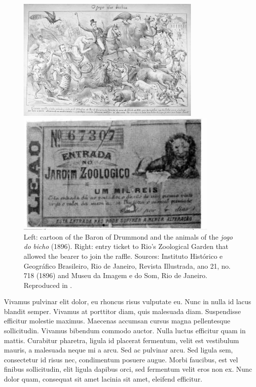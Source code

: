 \documentclass[a4paper,12pt]{article}
\begin{document}
\begin{figure}[!htbp]
 \centering
 \begin{minipage}[b]{0.45\textwidth}
  \includegraphics[width=\textwidth, height=6cm]{images/bicho01.jpg}
 \end{minipage}
 \hfill
 \begin{minipage}[b]{0.45\textwidth}
  \includegraphics[width=\textwidth, height=6cm]{images/bicho02.jpg}
 \end{minipage}
 \caption{Left: cartoon of the Baron of Drummond and the animals of the \emph{jogo do bicho} (1896). Right: entry ticket to Rio's Zoological Garden that allowed the bearer to join the raffle. Sources: Instituto Histórico e Geográfico Brasileiro, Rio de Janeiro, Revista Illustrada, ano 21, no. 718 (1896) and Museu da Imagem e do Som, Rio de Janeiro. Reproduced in \citet[35--36]{chazkel2011laws}.}
 \label{fig:barao}
\end{figure}

Vivamus pulvinar elit dolor, eu rhoncus risus vulputate eu. Nunc in nulla id lacus blandit semper. Vivamus at porttitor diam, quis malesuada diam. Suspendisse efficitur molestie maximus. Maecenas accumsan cursus magna pellentesque sollicitudin. Vivamus bibendum commodo auctor. Nulla luctus efficitur quam in mattis. Curabitur pharetra, ligula id placerat fermentum, velit est vestibulum mauris, a malesuada neque mi a arcu. Sed ac pulvinar arcu. Sed ligula sem, consectetur id risus nec, condimentum posuere augue. Morbi faucibus, est vel finibus sollicitudin, elit ligula dapibus orci, sed fermentum velit eros non ex. Nunc dolor quam, consequat sit amet lacinia sit amet, eleifend efficitur.
\end{document}
